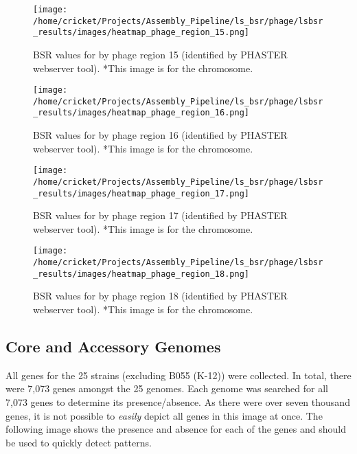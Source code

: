 \documentclass[11pt]{article}
\begin{document}
\begin{figure}[ht!]\normalsize %
\centering
\texttt{[image: /home/cricket/Projects/Assembly\_Pipeline/ls\_bsr/phage/lsbsr\_results/images/heatmap\_phage\_region\_15.png]} 
\caption{BSR values for by phage region 15 (identified by PHASTER webserver tool). *This image is for the chromosome.}
\label{phage_15}
\end{figure}

\clearpage

\begin{figure}[ht!]\normalsize %
\centering
\texttt{[image: /home/cricket/Projects/Assembly\_Pipeline/ls\_bsr/phage/lsbsr\_results/images/heatmap\_phage\_region\_16.png]} 
\caption{BSR values for by phage region 16 (identified by PHASTER webserver tool). *This image is for the chromosome.}
\label{phage_16}
\end{figure}

\begin{figure}[ht!]\normalsize %
\centering
\texttt{[image: /home/cricket/Projects/Assembly\_Pipeline/ls\_bsr/phage/lsbsr\_results/images/heatmap\_phage\_region\_17.png]} 
\caption{BSR values for by phage region 17 (identified by PHASTER webserver tool). *This image is for the chromosome.}
\label{phage_17}
\end{figure}

\clearpage

\begin{figure}[ht!]\normalsize %
\centering
\texttt{[image: /home/cricket/Projects/Assembly\_Pipeline/ls\_bsr/phage/lsbsr\_results/images/heatmap\_phage\_region\_18.png]} 
\caption{BSR values for by phage region 18 (identified by PHASTER webserver tool). *This image is for the chromosome.}
\label{phage_18}
\end{figure}
\clearpage

\subsection*{Core and Accessory Genomes}
All genes for the 25 strains (excluding B055 (K-12)) were collected. In total, there were 7,073 genes amongst the 25 genomes. Each genome was searched for all 7,073 genes to determine its presence/absence. As there were over seven thousand genes, it is not possible to \textit{easily} depict all genes in this image at once. The following image shows the presence and absence for each of the genes and should be used to quickly detect patterns.  
\end{document}
